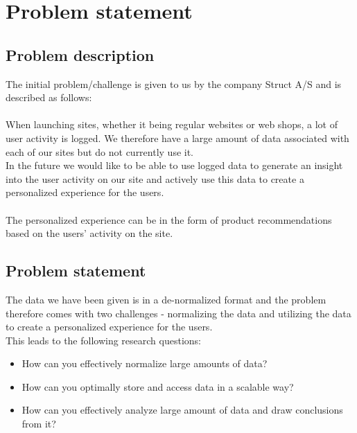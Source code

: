 
\chapter{Problem statement} %

\label{Chapter1} %


\section{Problem description}

The initial problem/challenge  is given to us by the company Struct A/S and is described as follows: \\\\
When launching sites, whether it being regular websites or web shops, a lot of user activity is logged. We therefore have a large amount of data associated with each of our sites but do not currently use it. \\
In the future we would like to be able to use logged data to generate an insight into the user activity on our site and actively use this data to create a personalized experience for the users. \\\\
The personalized experience can be in the form of product recommendations based on the users' activity on the site.



\section{Problem statement}
The data we have been given is in a de-normalized format and the problem therefore comes with two challenges - normalizing the data and utilizing the data to create a personalized experience for the users. \\
This leads to the following research questions:
\begin{itemize}
\item How can you effectively normalize large amounts of data?
\item How can you optimally store and access data in a scalable way?
\item How can you effectively analyze large amount of data and draw conclusions from it?
\end{itemize}
